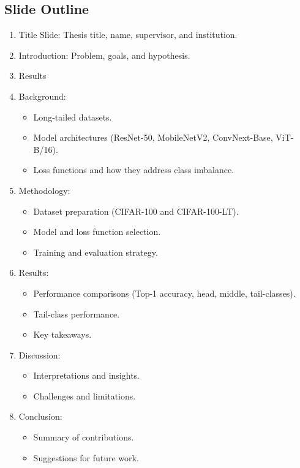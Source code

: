 \documentclass[a4paper,12pt]{article}
\begin{document}
\subsection{Slide Outline}
\begin{enumerate}
    \item Title Slide: Thesis title, name, supervisor, and institution.
    \item Introduction: Problem, goals, and hypothesis.
    \item Results
    \item Background:
        \begin{itemize}
            \item Long-tailed datasets.
            \item Model architectures (ResNet-50, MobileNetV2, ConvNext-Base, ViT-B/16).
            \item Loss functions and how they address class imbalance.
        \end{itemize}
    \item Methodology:
        \begin{itemize}
            \item Dataset preparation (CIFAR-100 and CIFAR-100-LT).
            \item Model and loss function selection.
            \item Training and evaluation strategy.
        \end{itemize}
    \item Results:
        \begin{itemize}
            \item Performance comparisons (Top-1 accuracy, head, middle, tail-classes).
            \item Tail-class performance.
            \item Key takeaways.
        \end{itemize}
    \item Discussion:
        \begin{itemize}
            \item Interpretations and insights.
            \item Challenges and limitations.
        \end{itemize}
    \item Conclusion:
        \begin{itemize}
            \item Summary of contributions.
            \item Suggestions for future work.
        \end{itemize}
\end{enumerate}
\end{document}
